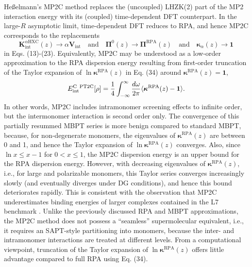 \documentclass[journal=jctcce,manuscript=article]{achemso}
\newcommand*{\rev}[1]{{\color{blue} #1}}
\begin{document}
\rev{He{\ss}elmann's MP2C method \cite{doi:10.1063/1.2905808,
    Pitonak10JChemTheoryComput6p168,doi:10.1063/1.4809981}
  replaces
the (uncoupled) LHZK(2) part of the MP2 interaction energy with its
(coupled) time-dependent DFT counterpart. In the large-$R$ asymptotic
limit, time-dependent DFT reduces to RPA, and hence MP2C corresponds
to the replacements
\begin{equation}
  \label{eq:pt2cep}
\mathbf{K}^{\alpha\text{HXC}}_\text{int}(z)
\rightarrow \alpha \mathbf{V}_{\text{int}}\quad \text{and} \quad
\boldsymbol{\Pi}^0(z) 
\rightarrow \boldsymbol{\Pi}^{\text{RPA}}(z) \quad \text{and} \quad
\boldsymbol{\kappa}_{\alpha}(z) \rightarrow \mathbf{1}
\end{equation}
in Eqs. (13)-(23). Equivalently, MP2C may be
understood as a low-order approximation to the RPA dispersion energy
resulting from first-order truncation of the Taylor expansion of $\ln
\boldsymbol{\kappa}^{\text{RPA}}(z)$ in Eq. (34) around
$\boldsymbol{\kappa}^{\text{RPA}}(z) = \mathbf{1}$,
\begin{equation}
  \label{eq:ecabmp2c}
  E^{\text{C\, PT2C}}_{\text{int}}[\rho] = \frac{1}{4}
  \int_{-\infty}^{\infty} \frac{d\omega}{2\pi} \langle 
    \boldsymbol{\kappa}^{\text{RPA}}(z) - \mathbf{1} \rangle.
\end{equation}
In other words, MP2C includes intramonomer screening effects to infinite
order, but the intermonomer interaction is second order only. The
convergence of this partially resummed MBPT series is more benign
compared to standard MBPT, because, for non-degenerate monomers, the
eigenvalues of $\boldsymbol{\kappa}^{\text{RPA}}(z)$ are between 0 and
1, and hence the Taylor expansion of  $\ln
\boldsymbol{\kappa}^{\text{RPA}}(z)$ converges. Also,
since $\ln x \leq x-1$ for $0 <x \leq 1$, the MP2C dispersion energy is
an upper bound for the RPA dispersion energy. However, 
with decreasing eigenvalues of $\boldsymbol{\kappa}^{\text{RPA}}(z)$,
i.e., for large and polarizable monomers, this Taylor series converges
increasingly slowly (and eventually diverges under DG conditions), and hence
this bound deteriorates rapidly. This is consistent with the observation
that MP2C underestimates binding energies of larger complexes contained
in the L7 benchmark \cite{doi:10.1021/ct400036b}.
Unlike the previously discussed RPA and MBPT approximations,
the MP2C method does not possess a ``seamless'' supermolecular
equivalent, i.e., it requires an SAPT-style partitioning 
into monomers, because the inter- and intramonomer interactions are
treated at different levels. From a computational viewpoint, truncation
of the Taylor expansion of $\ln \boldsymbol{\kappa}^{\text{RPA}}(z)$ offers
little advantage compared to full RPA using Eq. (34).}
\end{document}
